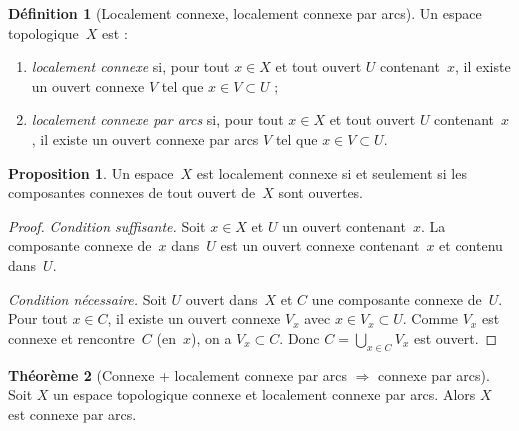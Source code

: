 \documentclass[12pt,a4paper,openany]{book}
\theoremstyle{definition}
\newtheorem{definition}{Définition}[chapter]
\theoremstyle{cours}
\newtheorem{theoreme}{Théorème}[chapter]
\newtheorem{proposition}[theoreme]{Proposition}
\theoremstyle{coursnormal}
\begin{document}
\begin{definition}[Localement connexe, localement connexe par arcs]
\label{def:localement-connexe}
Un espace topologique~$X$ est :
\begin{enumerate}[label=(\roman*)]
  \item \emph{localement connexe} si, pour tout $x \in X$ et tout ouvert $U$
        contenant~$x$, il existe un ouvert connexe $V$ tel que $x \in V \subset U$ ;
  \item \emph{localement connexe par arcs} si, pour tout $x \in X$ et tout ouvert $U$
        contenant~$x$, il existe un ouvert connexe par arcs $V$ tel que
        $x \in V \subset U$.
\end{enumerate}
\end{definition}

\begin{proposition}
\label{prop:loc-connexe-composantes-ouvertes}
Un espace~$X$ est localement connexe si et seulement si les composantes connexes
de tout ouvert de~$X$ sont ouvertes.
\end{proposition}

\begin{proof}
\emph{Condition suffisante.} Soit $x \in X$ et $U$ un ouvert contenant~$x$. La
composante connexe de~$x$ dans~$U$ est un ouvert connexe contenant~$x$ et contenu
dans~$U$.

\emph{Condition nécessaire.} Soit $U$ ouvert dans~$X$ et $C$ une composante connexe
de~$U$. Pour tout $x \in C$, il existe un ouvert connexe $V_x$ avec
$x \in V_x \subset U$. Comme $V_x$ est connexe et rencontre~$C$ (en~$x$), on a
$V_x \subset C$. Donc $C = \bigcup_{x \in C} V_x$ est ouvert.
\end{proof}

\begin{theoreme}[Connexe + localement connexe par arcs $\Rightarrow$ connexe par arcs]
\label{thm:connexe-loc-arcs}
Soit $X$ un espace topologique connexe et localement connexe par arcs.
Alors $X$ est connexe par arcs.
\end{theoreme}
\end{document}
